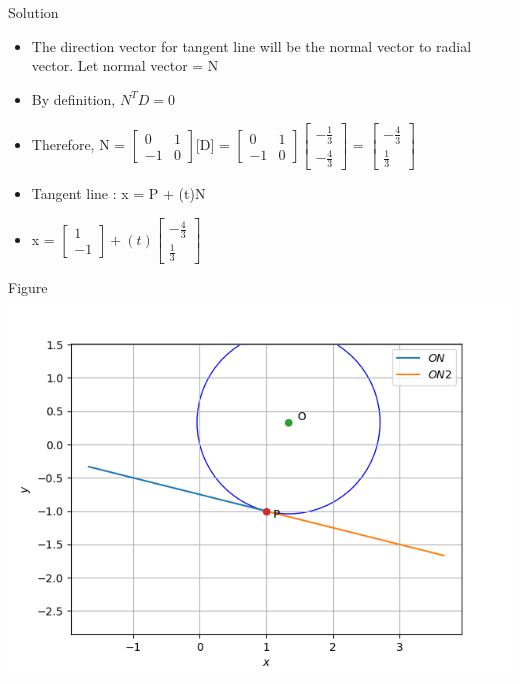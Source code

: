 \documentclass[12pt]{beamer}
\begin{document}
\begin{frame}{Solution}
\begin{itemize}
\item The direction vector for tangent line will be the normal vector to radial vector. Let normal vector = N
\item By definition, $N^{T}D = 0$
\item Therefore, N = $[\begin{matrix}
0 & 1 \\ 
-1 & 0
\end{matrix}]$[D] = $[\begin{matrix}
0 & 1 \\ 
-1 & 0
\end{matrix}][\begin{array}{c}
-\frac{1}{3} \\ 
-\frac{4}{3}
\end{array}]$ = $[\begin{array}{c}
-\frac{4}{3} \\ 
\frac{1}{3}
\end{array}]$
 \item Tangent line : x = P + (t)N
 
 \vspace{0.5em} 
 \item x = $[\begin{array}{c}
1 \\ 
-1
\end{array}] + (t)[\begin{array}{c}
-\frac{4}{3} \\ 
\frac{1}{3}
\end{array}]$

\end{itemize}

\end{frame}

\begin{frame}{Figure}
\includegraphics[scale=0.7]{Figure_1.png}

\end{frame}
\end{document}
